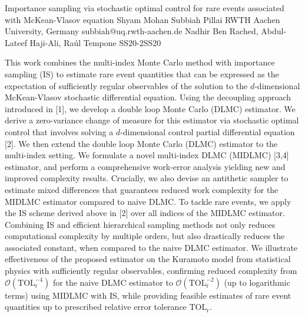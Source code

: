\begin{talk}
  {Importance sampling via stochastic optimal control for rare events associated with McKean-Vlasov equation}%
  {Shyam Mohan Subbiah Pillai}%
  {RWTH Aachen University, Germany}%
  {subbiah@uq.rwth-aachen.de}%
  {Nadhir Ben Rached, Abdul-Lateef Haji-Ali, Ra\'ul Tempone}%
{}{}{SS20-2}{SS20}

			
This work combines the multi-index Monte Carlo method with importance sampling (IS) to estimate rare event quantities that can be expressed as the expectation of sufficiently regular observables of the solution to the $d$-dimensional McKean-Vlasov stochastic differential equation. Using the decoupling approach introduced in [1], we develop a double loop Monte Carlo (DLMC) estimator. We derive a zero-variance change of measure for this estimator via stochastic optimal control that involves solving a $d$-dimensional control partial differential equation [2]. We then extend the double loop Monte Carlo (DLMC) estimator to the multi-index setting. We formulate a  novel multi-index DLMC (MIDLMC) [3,4] estimator, and perform a comprehensive work-error analysis yielding new and improved complexity results. Crucially, we also devise an antithetic sampler to estimate mixed differences that guarantees reduced work complexity for the  MIDLMC estimator compared to naive DLMC. To tackle rare events, we apply the IS scheme derived above in [2] over all indices of the MIDLMC estimator. Combining IS and efficient hierarchical sampling methods not only reduces computational complexity by multiple orders, but also drastically reduces the associated constant, when compared to the naive DLMC estimator. We illustrate effectiveness of the proposed estimator on the Kuramoto model from statistical physics with sufficiently regular observables, confirming reduced complexity from $\mathcal{O}(\mathrm{TOL}_{\mathrm{r}}^{-4})$ for the naive DLMC estimator to $\mathcal{O}(\mathrm{TOL}_{\mathrm{r}}^{-2})$ (up to logarithmic terms) using MIDLMC with IS, while providing feasible estimates of rare event quantities up to prescribed relative error tolerance $\mathrm{TOL}_{\mathrm{r}}$.

\medskip


\end{talk}
